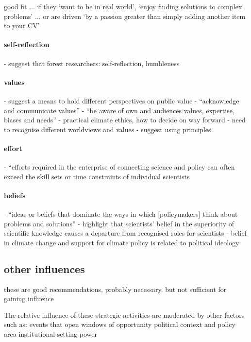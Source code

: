 good fit ... if they `want to be in real world', `enjoy finding solutions to complex problems' ... or are driven `by a passion greater than simply adding another item to your CV'
\paragraph{self-reflection}
\cite{OjanenBKP2021} - suggest that forest researchers: self-reflection, humbleness
\paragraph{values}
\cite{GeuijenMCRv2017} - suggest a means to hold different perspectives on public value
\cite{GregoryBW2024} - ``acknowledge and communicate values''
\cite{ElsensohnACDGGKPRS2019} - ``be aware of own and audiences values, expertise, biases and needs''
\cite{VoisardW2023} - practical climate ethics, how to decide on way forward
\cite{PascualEtAl2018} - need to recognise different worldviews and values
\cite{RogeljLPLWXXXX} - suggest using principles
\paragraph{effort}
\cite{BednarekSHG2015} - ``efforts required in the enterprise of connecting science and policy can often exceed the skill sets or time constraints of individual scientists
\paragraph{beliefs}
\cite{CairneyW2017} - ``ideas or beliefs that dominate the ways in which [policymakers] think about problems and solutions''
\cite{BalvaneraJNOBCDGGKKMPSSW2020} - highlight that scientists' belief in the superiority of scientific knowledge causes a departure from recognised roles for scientists
\cite{BerkebileWeinbergGDVV2024} - belief in climate change and support for climate policy is related to political ideology

\subsection{other influences}
these are good recommendations, probably necessary, but not sufficient for gaining influence


The relative influence of these strategic activities are moderated by other factors such as:
events that open windows of opportunity \cite{RoseBOP2018}
political context and policy area \cite{IbarraJOBCIMRS2022,SaxonbergSL2023,VelanderD2024}
institutional setting \cite{WeyrauchES2016,OjanenBKP2021,SaxonbergSL2023}
power \cite{MacKillopCDD2023}

